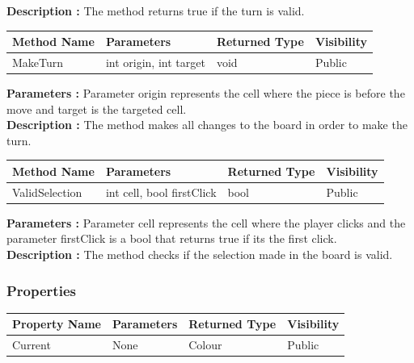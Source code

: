 \documentclass[12pt]{article}
\begin{document}
\textbf{Description :} The method returns true if the turn is valid.

\begin{table}[H]
    \begin{tabular}{|l|l|l|l|}
    \hline
    \rowcolor[HTML]{EFEFEF} 
    \cellcolor[HTML]{EFEFEF}\textbf{Method Name} & \textbf{Parameters}    & \textbf{Returned Type} & \textbf{Visibility} \\ \hline
    MakeTurn                                     & int origin, int target & void                   & Public              \\ \hline
    \end{tabular}
\end{table}

\textbf{Parameters :} Parameter origin represents the cell
where the piece is before the move and target is the targeted cell.
\\

\textbf{Description :} The method makes all changes to the board in order to make the turn.

\begin{table}[H]
    \begin{tabular}{|l|l|l|l|}
    \hline
    \rowcolor[HTML]{EFEFEF} 
    \cellcolor[HTML]{EFEFEF}\textbf{Method Name} & \textbf{Parameters}       & \textbf{Returned Type} & \textbf{Visibility} \\ \hline
    ValidSelection                               & int cell, bool firstClick & bool                   & Public              \\ \hline
    \end{tabular}
\end{table}

\textbf{Parameters :} Parameter cell represents the cell
where the player clicks and the parameter firstClick is a bool
that returns true if its the first click.
\\

\textbf{Description :} The method checks if the selection made
in the board is valid.

\subsubsection{Properties}

\begin{table}[H]
    \begin{tabular}{|l|l|l|l|}
    \hline
    \rowcolor[HTML]{EFEFEF} 
    \cellcolor[HTML]{EFEFEF}\textbf{Property Name} & \textbf{Parameters}  & \textbf{Returned Type} & \textbf{Visibility} \\ \hline
    Current                                        & None                 & Colour                 & Public              \\ \hline
    \end{tabular}
\end{table}
\end{document}

